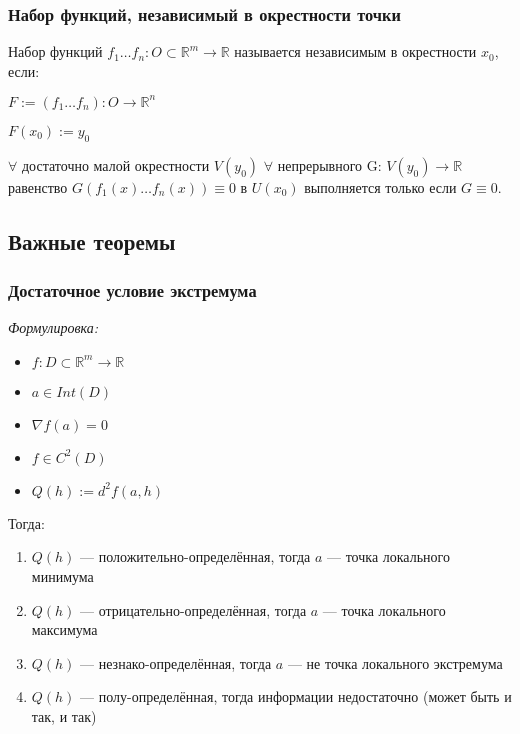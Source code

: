 \documentclass{article}
\begin{document}
\subsubsection{Набор функций, независимый в окрестности точки}


Набор функций $f_1 \ldots f_n: O \subset \mathbb{R}^m \rightarrow \mathbb{R}$ называется независимым в окрестности $x_0$, если:

$F := (f_1 \ldots f_n): O \rightarrow \mathbb{R}^n$

$F(x_0) := y_0$

$\forall$ достаточно малой окрестности $V(y_0)$ $\forall$ непрерывного G: $V(y_0) \rightarrow \mathbb{R}$ равенство $G(f_1(x) \ldots f_n(x)) \equiv 0 $ в $ U(x_0)$ выполняется только если $G \equiv 0$.

\newpage
\subsection{Важные теоремы}
\subsubsection{Достаточное условие экстремума}

\textit{Формулировка:}
\begin{itemize}
    \item $f: D \subset \mathbb{R}^m \rightarrow \mathbb{R}$
    \item $a \in Int(D)$
    \item $\nabla f (a) = 0$
    \item $f \in C^2(D)$
    \item $Q(h) := d^2f(a, h)$
\end{itemize}

Тогда: 

\begin{enumerate}
    \item $Q(h)$ --- положительно-определённая, тогда $a$ --- точка локального минимума
    \item $Q(h)$ --- отрицательно-определённая, тогда $a$ --- точка локального максимума
    \item $Q(h)$ --- незнако-определённая, тогда $a$ --- не точка локального экстремума
    \item $Q(h)$ --- полу-определённая, тогда информации недостаточно (может быть и так, и так)
\end{enumerate}
\end{document}
